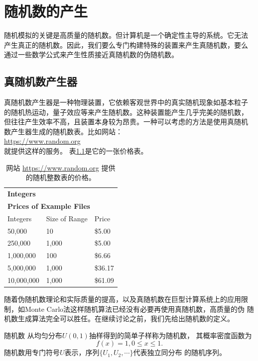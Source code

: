 \chapter{随机数的产生}

随机模拟的关键是高质量的随机数。但计算机是一个确定性主导的系统。它无法
产生真正的随机数。因此，我们要么专门构建特殊的装置来产生真随机数，要么
通过一些数学公式来产生性质接近真随机数的伪随机数\cite{Kang2015MonteCarlo}。

\section{真随机数产生器}

真随机数产生器是一种物理装置，它依赖客观世界中的真实随机现象如基本粒子
的随机热运动，量子效应等来产生随机数。这种装置能产生几乎完美的随机数，
但往往产生效率不高，且装置本身较为昂贵。一种可以考虑的方法是使用真随机
数产生器生成的随机数表。比如网站：\\
\href{https://www.random.org}{https://www.random.org} \\
就提供这样的服务。
表\ref{table::random_org}是它的一张价格表。

\begin{table}
  \centering
  \begin{tabular}[!ht]{lll}
    \multicolumn{3}{l}{\bf Integers}\\
    \multicolumn{3}{l}{\bf Prices of Example Files}\\
    \hline
    \hline
Integers & Size of Range  & Price \\
\hline
50,000	& 10	& \$5.00 \\
\hline
250,000	& 1,000	& \$5.00 \\
\hline
1,000,000 & 100	& \$6.66 \\
\hline
5,000,000 & 1,000 & \$36.17 \\
\hline
10,000,000 & 1,000 & \$61.09\\
\hline
\end{tabular}
  \caption{网站 \href{https://www.random.org}{https://www.random.org}
    提供的随机整数表的价格。}
  \label{table::random_org}
\end{table}

随着伪随机数理论和实际质量的提高，以及真随机数在巨型计算系统上的应用限
制，如Monte Carlo法这样随机算法已经没有必要再使用真随机数，高质量的伪
随机数生成算法完全可以胜任。在继续讨论之前，我们先给出随机数的定义。

\begin{definition} {\hei 随机数} 从均匀分布$U(0, 1)$抽样得到的简单子样称为随机数，
  其概率密度函数为
  $$
  f(x) = 1, 0 \leq x \leq 1.
  $$
  随机数用专门符号$U$表示，序列$\{U_1, U_2, \cdots\}$代表独立同分布
  的随机序列。
  \label{def::psudo_random_number}
\end{definition}

